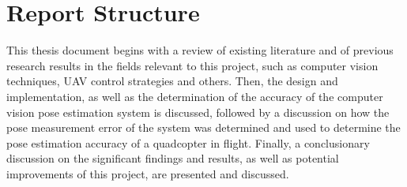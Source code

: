 \section{Report Structure}

This thesis document begins with a review of existing literature and of previous research results in the fields relevant to this project, such as computer vision techniques, UAV control strategies and others. Then, the design and implementation, as well as the determination of the accuracy of the computer vision pose estimation system is discussed, followed by a discussion on how the pose measurement error of the system was determined and used to determine the pose estimation accuracy of a quadcopter in flight. Finally, a conclusionary discussion on the significant findings and results, as well as potential improvements of this project, are presented and discussed. 
